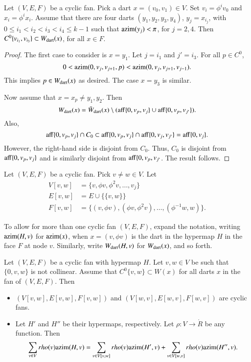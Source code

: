 \begin{lemma}  Let $(V,E,F)$ be a cyclic fan.  Pick a dart $x=(v_0,v_1)\in V$.  Set $v_i = \phi^i v_0$ and $x_i = \phi^i x_i$.  Assume that there are four darts $(y_1,y_2,y_3,y_4)$, $y_j = x_{i_j}$, with
$0\le i_1 < i_2 < i_3 < i_4\le k-1$ 
such that ${\operatorname{azim}}(y_j) < \pi$, for $j=2,4$.  
Then $C^0\{v_{i_1},v_{i_3}\} \subset W_{\text{dart}}(x)$, for all $x\in F$.
\end{lemma}

\begin{proof} The first case to consider is $x=y_1$.  Let $j=i_1$ and $j' = i_3$. For all $p\in C^0$, 
$$
0 < {\operatorname{azim}}(0,v_{j},v_{j+1},p) < {\operatorname{azim}}(0,v_j,v_{j+1},v_{j-1}).
$$  
This implies $p\in W_{\text{dart}}(x)$ as desired.  The case $x=y_3$ is similar.

Now assume that $x=x_p\ne y_1,y_2$.  Then
$$
W_{\text{dart}}(x) = \bar W_{\text{dart}}(x)\setminus ({\operatorname{aff}}\{0,v_p,v_j\}\cup{\operatorname{aff}}\{0,v_p,v_{j'}\}).
$$
Also, 
$$
{\operatorname{aff}}\{0,v_p,v_j\}\cap C_0 \subset {\operatorname{aff}}\{0,v_p,v_j\}\cap {\operatorname{aff}}\{0,v_j,v_{j'}\} = {\operatorname{aff}}\{0,v_j\}.
$$
However, the right-hand side is disjoint from $C_0$.  Thus, $C_0$ is disjoint from ${\operatorname{aff}}\{0,v_p,v_j\}$ and is similarly disjoint from ${\operatorname{aff}}\{0,v_p,v_{j'}$.  The result follows.
\end{proof}

\begin{definition} Let $(V,E,F)$ be a cyclic fan.  Pick $v\ne w\in V$.
Let
$$
\begin{array}{lll}
V[v,w] &= \{v,\phi v,\phi^2 v,\ldots,v_j\}\\
E[v,w] &= E \cup \{\{v,w\}\}\\
F[v,w] &= \{(v,\phi v),(\phi v,\phi^2 v),\ldots,(\phi^{-1}w,w)\}.
\end{array}
$$
\end{definition}

To allow for more than one cyclic fan $(V,E,F)$,  expand the notation, writing ${\operatorname{azim}}(H,v)$ for ${\operatorname{azim}}(x)$, when $x=(v,\phi v)$ is the dart in the hypermap $H$ in the face $F$ at node $v$.  Similarly, write $W_{\text{dart}}(H,v)$ for $W_{\text{dart}}(x)$, and so forth.


\begin{lemma}  Let $(V,E,F)$ be a cyclic fan with hypermap $H$.  Let $v,w\in V$ be such that $\{0,v,w\}$ is not collinear.  Assume that $C^0\{v,w\}\subset W(x)$ for all darts $x$ in the fan of $(V,E,F)$. Then
\begin{itemize}
\item $(V[v,w],E[v,w],F[v,w])$ and $(V[w,v],E[w,v],F[w,v])$ are cyclic fans.  
\item Let $H'$ and $H''$ be their hypermaps, respectively.  Let $\rho:V\to\ring{R}$ be any function.  Then
$$
\sum_{v\in V} rho(v){\operatorname{azim}}(H,v) = \sum_{v\in V[v,w]}rho(v){\operatorname{azim}}(H',v) + \sum_{v\in V[w,v]}rho(v){\operatorname{azim}}(H'',v).
$$
\end{itemize}
\end{lemma}

